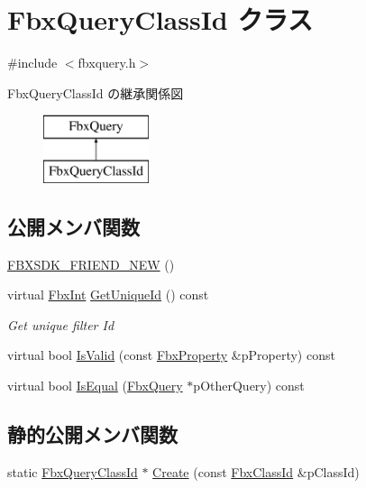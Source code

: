 \hypertarget{class_fbx_query_class_id}{}\section{Fbx\+Query\+Class\+Id クラス}
\label{class_fbx_query_class_id}


{\ttfamily \#include $<$fbxquery.\+h$>$}

Fbx\+Query\+Class\+Id の継承関係図\begin{figure}[H]
\begin{center}
\leavevmode
\includegraphics[height=2.000000cm]{class_fbx_query_class_id}
\end{center}
\end{figure}
\subsection*{公開メンバ関数}
\begin{DoxyCompactItemize}
\item 
\hyperlink{class_fbx_query_class_id_a2693a06ca55fe4fdd0bf3dacc986be0f}{F\+B\+X\+S\+D\+K\+\_\+\+F\+R\+I\+E\+N\+D\+\_\+\+N\+EW} ()
\item 
virtual \hyperlink{fbxtypes_8h_a088fa96de3b0b3ea69f0f6afef525dfb}{Fbx\+Int} \hyperlink{class_fbx_query_class_id_a9460258f2525b83b7e81f87a3bcc2c61}{Get\+Unique\+Id} () const
\begin{DoxyCompactList}\small\item\em Get unique filter Id \end{DoxyCompactList}\item 
virtual bool \hyperlink{class_fbx_query_class_id_aaa9990771cab43ddc199eaeac2b6d754}{Is\+Valid} (const \hyperlink{class_fbx_property}{Fbx\+Property} \&p\+Property) const
\item 
virtual bool \hyperlink{class_fbx_query_class_id_ac20046270f87a7bb84fbf776980431af}{Is\+Equal} (\hyperlink{class_fbx_query}{Fbx\+Query} $\ast$p\+Other\+Query) const
\end{DoxyCompactItemize}
\subsection*{静的公開メンバ関数}
\begin{DoxyCompactItemize}
\item 
static \hyperlink{class_fbx_query_class_id}{Fbx\+Query\+Class\+Id} $\ast$ \hyperlink{class_fbx_query_class_id_a8627c647cbb20945d7baf91e37c826f1}{Create} (const \hyperlink{class_fbx_class_id}{Fbx\+Class\+Id} \&p\+Class\+Id)
\end{DoxyCompactItemize}

